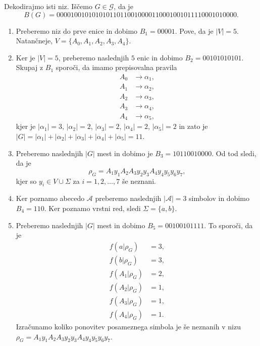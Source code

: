 \documentclass[fin1, tisk]{fmfdelo}
\providecommand{\abs}[1]{\left\lvert #1 \right\rvert}
\newcommand{\A}{\mathcal{A}}
\newcommand{\G}{\mathcal{G}}
\theoremstyle{definition}
\begin{document}
\begin{primer}
    Dekodirajmo isti niz. Iščemo $G \in \G$, da je
    \[
        B(G) = 00001 00101010101 10110010000 110 00100101111 0001010000.
    \]
    \begin{enumerate}
        \item Preberemo niz do prve enice in dobimo $B_1 = 00001$. Pove, da je $\abs{V} = 5 $.
        Natančneje, $V = \{ A_0, A_1, A_2, A_3, A_4\}$.
        \item Ker je $\abs{V} = 5$, preberemo naslednjih $5$ enic in dobimo $B_2 = 00101010101$.
        Skupaj z $B_1$ sporoči, da imamo prepisovalna pravila
        \begin{align*}
            A_0 &\rightarrow \alpha_1, \\
            A_1 &\rightarrow \alpha_2, \\
            A_2 &\rightarrow \alpha_3, \\
            A_3 &\rightarrow \alpha_4, \\
            A_4 &\rightarrow \alpha_5,
        \end{align*}
        kjer je $\abs{\alpha_1} = 3$, $\abs{\alpha_2} = 2$, $\abs{\alpha_3} = 2$,
        $\abs{\alpha_4} = 2$, $\abs{\alpha_5} = 2$ in zato je
        $\abs{G} = \abs{\alpha_1} + \abs{\alpha_2} + \abs{\alpha_3} + \abs{\alpha_4} + \abs{\alpha_5} = 11$.
        \item Preberemo naslednjih $\abs{G}$ mest in dobimo je $B_3 = 10110010000$.
        Od tod sledi, da je 
        \[
            \rho_G = A_1y_1A_2A_3y_2y_3A_4y_4y_5y_6y_7,
        \]
        kjer so $y_i \in V \cup \Sigma$ za $i = 1,2, \ldots, 7$ še neznani.
        \item Ker poznamo abecedo $\A$ preberemo naslednjih $\abs{\A} = 3$ simbolov in dobimo
        $B_4 = 110$. Ker poznamo vrstni red, sledi $\Sigma = \{ a, b \}$.
        \item Preberemo naslednjih $\abs{G}$ mest in dobimo $B_5 = 00100101111$. To sporoči,
        da je
        \begin{align*}
            f(a|\rho_G) &= 3,\\
            f(b|\rho_G) &= 3,\\
            f(A_1|\rho_G) &= 2,\\
            f(A_2|\rho_G) &= 1,\\
            f(A_3|\rho_G) &= 1,\\
            f(A_4|\rho_G) &= 1.
        \end{align*}
        Izračunamo koliko ponovitev posameznega simbola je še neznanih v nizu
        $\rho_G = A_1y_1A_2A_3y_2y_3A_4y_4y_5y_6y_7$.

\end{enumerate}
\end{primer}
\end{document}
